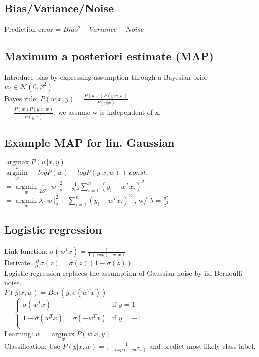 \subsection*{Bias/Variance/Noise}
Prediction error = $Bias^2 + Variance + Noise$

\subsection*{Maximum a posteriori estimate (MAP)}
Introduce bias by expressing assumption through a Bayesian prior $w_i \in \mathcal{N}(0, \beta^2)$\\
Bayes rule: $P(w|x,y) = \frac{P(w|x) P(y|x,w)}{P(y|x)}$\\
$ = \frac{P(w) P(y|x,w)}{P(y|x)}$, we assume w is independent of x.

\subsection*{Example MAP for lin. Gaussian}
$ \underset{w}{\operatorname{argmax}} P(w|x,y) = $\\ 
$\underset{w}{\operatorname{argmin}} - log P(w) - log P(y|x,w) + const.$ \\
$= \underset{w}{\operatorname{argmin}} \frac{1}{2\beta^2} ||w||_2^2 + \frac{1}{2\sigma^2} \sum_{i=1}^n (y_i - w^Tx_i)^2$ \\
$= \underset{w}{\operatorname{argmin}} \lambda ||w||_2^2 + \sum_{i=1}^n (y_i - w^Tx_i)^2$ , w/ $\lambda = \frac{\sigma^2}{\beta^2}$

\subsection*{Logistic regression}
Link function: $\sigma(w^Tx) = \frac{1}{1+exp(-w^Tx)}$\\
Derivate: $\frac{\partial}{\partial z} \sigma(z) = \sigma(z)(1-\sigma(z))$\\
Logistic regression replaces the assumption of Gaussian noise by iid Bernoulli noise.\\
$P(y|x,w) = Ber(y; \sigma(w^Tx))$\\
$= \begin{cases} 
		\sigma(w^T x) & \text{if } y = 1\\
		1-\sigma (w^T x)=\sigma (-w^Tx) & \text{if } y = -1\\
		\end{cases}
$\\
Learning: $w = \underset{w}{\operatorname{argmax}} P(w|x,y)$\\
Classification: Use $P(y|x,w) = \frac{1}{1+exp(-yw^Tx)}$ and predict most likely class label.

